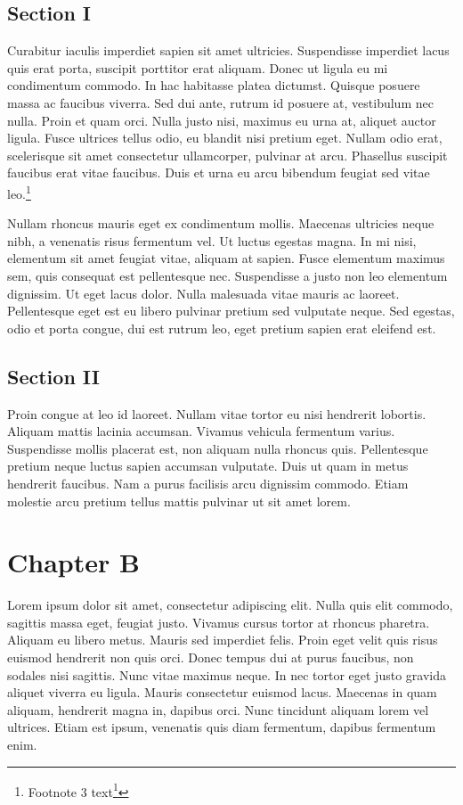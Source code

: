 \section{Section I}
\label{sectioni}

Curabitur iaculis imperdiet sapien sit amet ultricies. Suspendisse imperdiet lacus quis erat porta, suscipit porttitor erat aliquam. Donec ut ligula eu mi condimentum commodo. In hac habitasse platea dictumst. Quisque posuere massa ac faucibus viverra. Sed dui ante, rutrum id posuere at, vestibulum nec nulla. Proin et quam orci. Nulla justo nisi, maximus eu urna at, aliquet auctor ligula. Fusce ultrices tellus odio, eu blandit nisi pretium eget. Nullam odio erat, scelerisque sit amet consectetur ullamcorper, pulvinar at arcu. Phasellus suscipit faucibus erat vitae faucibus. Duis et urna eu arcu bibendum feugiat sed vitae leo.\footnote{Footnote 3 text\footnote{Footnote 4 text}}

Nullam rhoncus mauris eget ex condimentum mollis. Maecenas ultricies neque nibh, a venenatis risus fermentum vel. Ut luctus egestas magna. In mi nisi, elementum sit amet feugiat vitae, aliquam at sapien. Fusce elementum maximus sem, quis consequat est pellentesque nec. Suspendisse a justo non leo elementum dignissim. Ut eget lacus dolor. Nulla malesuada vitae mauris ac laoreet. Pellentesque eget est eu libero pulvinar pretium sed vulputate neque. Sed egestas, odio et porta congue, dui est rutrum leo, eget pretium sapien erat eleifend est.~%

\section{Section II}
\label{sectionii}

Proin congue at leo id laoreet. Nullam vitae tortor eu nisi hendrerit lobortis. Aliquam mattis lacinia accumsan. Vivamus vehicula fermentum varius. Suspendisse mollis placerat est, non aliquam nulla rhoncus quis. Pellentesque pretium neque luctus sapien accumsan vulputate. Duis ut quam in metus hendrerit faucibus. Nam a purus facilisis arcu dignissim commodo. Etiam molestie arcu pretium tellus mattis pulvinar ut sit amet lorem. 

\chapter{Chapter B}
\label{chapterb}

Lorem ipsum dolor sit amet, consectetur adipiscing elit. Nulla quis elit commodo, sagittis massa eget, feugiat justo. Vivamus cursus tortor at rhoncus pharetra. Aliquam eu libero metus. Mauris sed imperdiet felis. Proin eget velit quis risus euismod hendrerit non quis orci. Donec tempus dui at purus faucibus, non sodales nisi sagittis. Nunc vitae maximus neque. In nec tortor eget justo gravida aliquet viverra eu ligula. Mauris consectetur euismod lacus. Maecenas in quam aliquam, hendrerit magna in, dapibus orci. Nunc tincidunt aliquam lorem vel ultrices. Etiam est ipsum, venenatis quis diam fermentum, dapibus fermentum enim.


